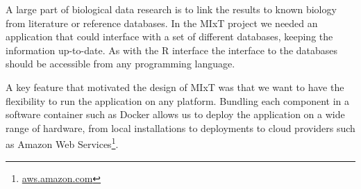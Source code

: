 A large part of biological data research is to link the results to known biology
from literature or reference databases. In the MIxT project we needed an
application that could interface with a set of different databases, keeping the
information up-to-date. As with the R interface the interface to the databases
should be accessible from any programming language. 

A key feature that motivated the design of MIxT was that we want to
have the flexibility to run the application on any platform. Bundling each
component in a software container such as Docker allows us to deploy the
application on a wide range of hardware, from local installations to deployments
to cloud providers such as Amazon Web Services\footnote{\url{aws.amazon.com}}.





